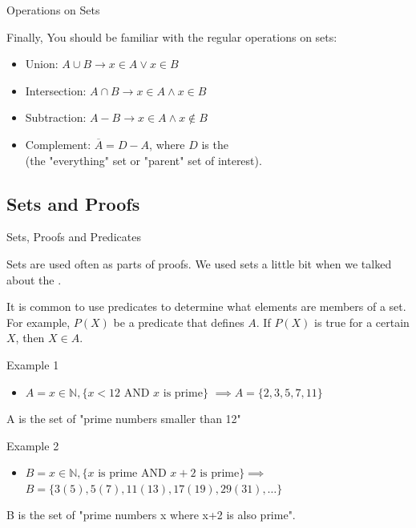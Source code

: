 \begin{frame}{Operations on Sets}

  Finally, You should be familiar with the regular operations on sets:
  \bigskip

    \begin{itemize}
    \item Union: $A \cup B \rightarrow x \in A \lor x \in B$\bigskip
    \item Intersection: $A \cap B \rightarrow x \in A \land x \in B$\bigskip
    \item Subtraction: $A - B \rightarrow x \in A \land x \notin B$\bigskip
    \item Complement: $\overline{A} = D - A$, where $D$ is the \\ (the "everything" set or "parent" set of interest).
    \end{itemize}
\end{frame}

\subsection{Sets and Proofs}

\begin{frame}{Sets, Proofs and Predicates}

  Sets are used often as parts of proofs. We used sets a little bit when we talked about the .\bigskip

  It is common to use predicates to determine what elements are members of a set. For example, $P(X)$ be a predicate that defines $A$. If $P(X)$ is true for a certain $X$, then $X \in A$.

  \begin{block}{Example 1}
    \begin{itemize}
    \item $A = x \in \mathbb{N}, \{x < 12 \text{ AND } x \text{ is prime}\}$
    $\implies A = \{2,3,5,7,11\}$
    \end{itemize}
    A is the set of "prime numbers smaller than 12"
  \end{block}

  \begin{block}{Example 2}
    \begin{itemize}
    \item $B = x \in \mathbb{N}, \{x \text{ is prime AND } x+2 \text{ is prime}\} \implies$\\
    $B = \{3 (5), 5 (7), 11 (13), 17 (19), 29 (31), \ldots\}$
    \end{itemize}
    B is the set of "prime numbers x where x+2 is also prime".
  \end{block}
\end{frame}


